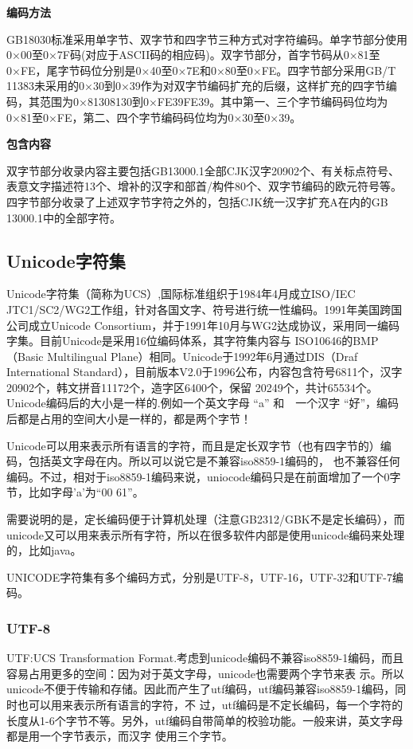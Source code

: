 \documentclass[doctor,openright,twoside]{sjtuthesis}
\theoremstyle{plain}
\theoremstyle{definition}
\theoremstyle{remark}
\theoremstyle{ocrenumbox}
\theoremstyle{plain}
\begin{document}
\textbf{编码方法}

GB18030标准采用单字节、双字节和四字节三种方式对字符编码。单字节部分使用0×00至0×7F码(对应于ASCII码的相应码)。双字节部分，首字节码从0×81至0×FE，尾字节码位分别是0×40至0×7E和0×80至0×FE。四字节部分采用GB/T
11383未采用的0×30到0×39作为对双字节编码扩充的后缀，这样扩充的四字节编码，其范围为0×81308130到0×FE39FE39。其中第一、三个字节编码码位均为0×81至0×FE，第二、四个字节编码码位均为0×30至0×39。

\textbf{包含内容}

双字节部分收录内容主要包括GB13000.1全部CJK汉字20902个、有关标点符号、表意文字描述符13个、增补的汉字和部首/构件80个、双字节编码的欧元符号等。四字节部分收录了上述双字节字符之外的，包括CJK统一汉字扩充A在内的GB
13000.1中的全部字符。

\hypertarget{unicode}{%
\subsection{Unicode字符集}\label{unicode}}

Unicode字符集（简称为UCS）,国际标准组织于1984年4月成立ISO/IEC
JTC1/SC2/WG2工作组，针对各国文字、符号进行统一性编码。1991年美国跨国公司成立Unicode
Consortium，并于1991年10月与WG2达成协议，采用同一编码字集。目前Unicode是采用16位编码体系，其字符集内容与
ISO10646的BMP（Basic Multilingual
Plane）相同。Unicode于1992年6月通过DIS（Draf International
Standard），目前版本V2.0于1996公布，内容包含符号6811个，汉字20902个，韩文拼音11172个，造字区6400个，保留
20249个，共计65534个。Unicode编码后的大小是一样的.例如一个英文字母 ``a''
和　一个汉字 ``好''，编码后都是占用的空间大小是一样的，都是两个字节！

Unicode可以用来表示所有语言的字符，而且是定长双字节（也有四字节的）编码，包括英文字母在内。所以可以说它是不兼容iso8859-1编码的，
也不兼容任何编码。不过，相对于iso8859-1编码来说，uniocode编码只是在前面增加了一个0字节，比如字母'a'为``00
61''。

需要说明的是，定长编码便于计算机处理（注意GB2312/GBK不是定长编码），而unicode又可以用来表示所有字符，所以在很多软件内部是使用unicode编码来处理的，比如java。

UNICODE字符集有多个编码方式，分别是UTF-8，UTF-16，UTF-32和UTF-7编码。

\hypertarget{utf-8}{%
\subsubsection{UTF-8}\label{utf-8}}

UTF:UCS Transformation
Format.考虑到unicode编码不兼容iso8859-1编码，而且容易占用更多的空间：因为对于英文字母，unicode也需要两个字节来表
示。所以unicode不便于传输和存储。因此而产生了utf编码，utf编码兼容iso8859-1编码，同时也可以用来表示所有语言的字符，不
过，utf编码是不定长编码，每一个字符的长度从1-6个字节不等。另外，utf编码自带简单的校验功能。一般来讲，英文字母都是用一个字节表示，而汉字
使用三个字节。
\end{document}
